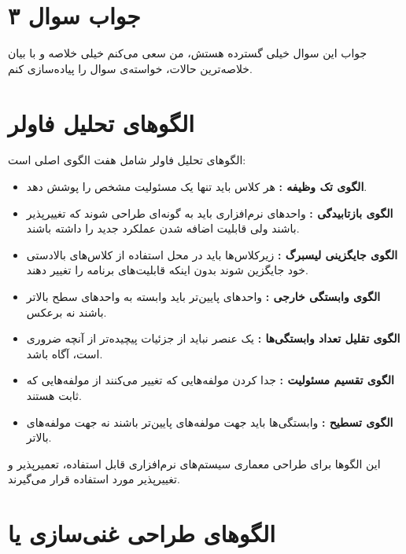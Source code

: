 \section*{جواب سوال ۳}

جواب این سوال خیلی گسترده هستش، من سعی می‌کنم خیلی خلاصه و با بیان خلاصه‌ترین حالات، خواسته‌ی سوال را پیاده‌سازی کنم.

\section*{الگوهای تحلیل فاولر}

الگوهای تحلیل فاولر شامل هفت الگوی اصلی است:

\begin{itemize}
	\item \textbf{الگوی تک وظیفه :} هر کلاس باید تنها یک مسئولیت مشخص را پوشش دهد.
	\item \textbf{الگوی بازتابیدگی :} واحدهای نرم‌افزاری باید به گونه‌ای طراحی شوند که تغییرپذیر باشند ولی قابلیت اضافه شدن عملکرد جدید را داشته باشند.
	\item \textbf{الگوی جایگزینی لیسبرگ :} زیرکلاس‌ها باید در محل استفاده از کلاس‌های بالادستی خود جایگزین شوند بدون اینکه قابلیت‌های برنامه را تغییر دهند.
	\item \textbf{الگوی وابستگی خارجی :} واحدهای پایین‌تر باید وابسته به واحدهای سطح بالاتر باشند نه برعکس.
	\item \textbf{الگوی تقلیل تعداد وابستگی‌ها :} یک عنصر نباید از جزئیات پیچیده‌تر از آنچه ضروری است، آگاه باشد.
	\item \textbf{الگوی تقسیم مسئولیت :} جدا کردن مولفه‌هایی که تغییر می‌کنند از مولفه‌هایی که ثابت هستند.
	\item \textbf{الگوی تسطیح :} وابستگی‌ها باید جهت مولفه‌های پایین‌تر باشند نه جهت مولفه‌های بالاتر.
\end{itemize}

این الگوها برای طراحی معماری سیستم‌های نرم‌افزاری قابل استفاده، تعمیرپذیر و تغییرپذیر مورد استفاده قرار می‌گیرند.

\section*{الگوهای طراحی غنی‌سازی یا }

